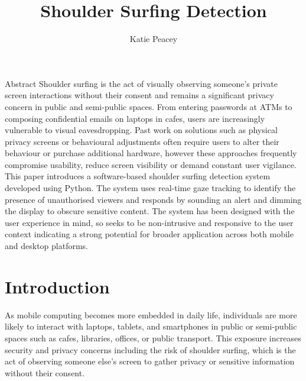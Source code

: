 \documentclass[12pt]{article}
\title{ Shoulder Surfing Detection}
\author{Katie Peacey}
\theoremstyle{plain}
\theoremstyle{definition}
\begin{document}

\maketitle
\studentdeclarations

\begin{frontmatterparagraph}{Abstract}
Shoulder surfing is the act of visually observing someone’s private screen interactions without their consent and remains a significant privacy concern in public and semi-public spaces. From entering passwords at ATMs to composing confidential emails on laptops in cafes, users are increasingly vulnerable to visual eavesdropping. Past work on solutions such as physical privacy screens or behavioural adjustments often require users to alter their behaviour or purchase additional hardware, however these approaches frequently compromise usability, reduce screen visibility or demand constant user vigilance. This paper introduces a software-based shoulder surfing detection system developed using Python. The system uses real-time gaze tracking to identify the presence of unauthorised viewers and responds by sounding an alert and dimming the display to obscure sensitive content. The system has been designed  with the user experience in mind, so seeks to be non-intrusive and responsive to the user context indicating a strong potential for broader application across both mobile and desktop platforms.
\end{frontmatterparagraph}

\tableofcontents

\listoffigures
\listoftables
\clearpage


\section{Introduction}
\label{sec:intro}

As mobile computing becomes more embedded in daily life, individuals are more likely to interact with laptops, tablets, and smartphones in public or semi-public spaces such as cafes, libraries, offices, or public transport. This exposure increases security and privacy concerns including the risk of shoulder surfing, which is the act of observing someone else’s screen to gather privacy or sensitive information without their consent.
\end{document}
